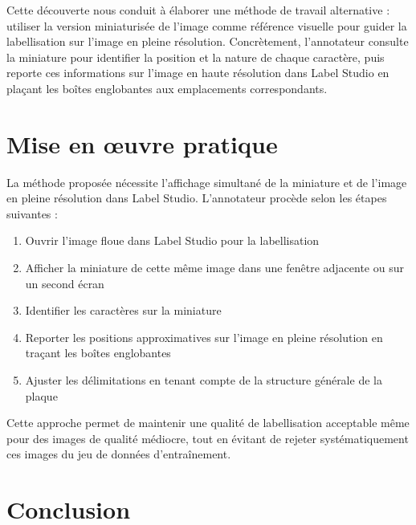 \documentclass[twocolumn]{el-author}
\begin{document}
Cette découverte nous conduit à élaborer une méthode de travail alternative : utiliser la version miniaturisée de l'image comme référence visuelle pour guider la labellisation sur l'image en pleine résolution. Concrètement, l'annotateur consulte la miniature pour identifier la position et la nature de chaque caractère, puis reporte ces informations sur l'image en haute résolution dans Label Studio en plaçant les boîtes englobantes aux emplacements correspondants.

\section{Mise en œuvre pratique}

La méthode proposée nécessite l'affichage simultané de la miniature et de l'image en pleine résolution dans Label Studio. L'annotateur procède selon les étapes suivantes :

\begin{enumerate}
\item Ouvrir l'image floue dans Label Studio pour la labellisation
\item Afficher la miniature de cette même image dans une fenêtre adjacente ou sur un second écran
\item Identifier les caractères sur la miniature
\item Reporter les positions approximatives sur l'image en pleine résolution en traçant les boîtes englobantes
\item Ajuster les délimitations en tenant compte de la structure générale de la plaque
\end{enumerate}


Cette approche permet de maintenir une qualité de labellisation acceptable même pour des images de qualité médiocre, tout en évitant de rejeter systématiquement ces images du jeu de données d'entraînement.

\section{Conclusion}
\end{document}
